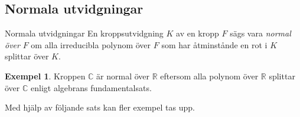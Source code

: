 \documentclass{article}
\theoremstyle{definition}
\newtheorem{exmp}[thm]{Exempel}
\begin{document}
\subsection{Normala utvidgningar}
\begin{mydef}{Normala utvidgningar}{}
  En kroppsutvidgning $K$ av en kropp $F$ sägs vara \textit{normal över} $F$ om alla irreducibla polynom över $F$ som har åtminstånde en rot i $K$ splittar 
  över $K$.
\end{mydef}

\begin{exmp}
  Kroppen $\mathbb{C}$ är normal över $\mathbb{R}$ eftersom alla polynom över $\mathbb{R}$ splittar över $\mathbb{C}$ enligt 
  algebrans fundamentalsats. 
\end{exmp}
Med hjälp av följande sats kan fler exempel tas upp. 
\end{document}
